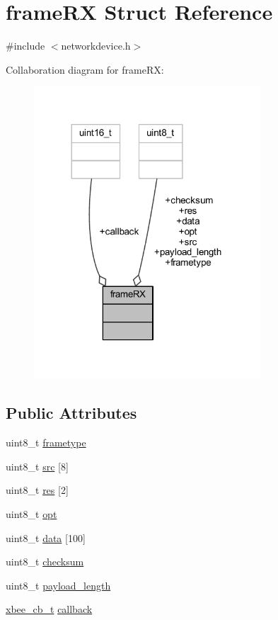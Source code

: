 \hypertarget{structframe_r_x}{}\section{frame\+RX Struct Reference}
\label{structframe_r_x}


{\ttfamily \#include $<$networkdevice.\+h$>$}



Collaboration diagram for frame\+RX\+:
\nopagebreak
\begin{figure}[H]
\begin{center}
\leavevmode
\includegraphics[width=240pt]{structframe_r_x__coll__graph}
\end{center}
\end{figure}
\subsection*{Public Attributes}
\begin{DoxyCompactItemize}
\item 
uint8\+\_\+t \hyperlink{structframe_r_x_a4684f3a419d7c6eaf5bded40cec73cdf}{frametype}
\item 
uint8\+\_\+t \hyperlink{structframe_r_x_a4a465dedf00b5d81f2f337c987b0ce96}{src} \mbox{[}8\mbox{]}
\item 
uint8\+\_\+t \hyperlink{structframe_r_x_a339160d2b3a24b3db0ea4318fc36227c}{res} \mbox{[}2\mbox{]}
\item 
uint8\+\_\+t \hyperlink{structframe_r_x_a46a068d1f1deb22e9e415b1ced537516}{opt}
\item 
uint8\+\_\+t \hyperlink{structframe_r_x_afdb061e4b3b406bf4890e95de2fbf474}{data} \mbox{[}100\mbox{]}
\item 
uint8\+\_\+t \hyperlink{structframe_r_x_a2ef590f48976b2550c7e12f2accf1e2f}{checksum}
\item 
uint8\+\_\+t \hyperlink{structframe_r_x_a8ffb1ad18c41d6943c8172042f965123}{payload\+\_\+length}
\item 
\hyperlink{networkdevice_8h_ad9c31236eed062640b6135a37fba175a}{xbee\+\_\+cb\+\_\+t} \hyperlink{structframe_r_x_a9483c0994c50cd55141215e73a75b95b}{callback}
\end{DoxyCompactItemize}


